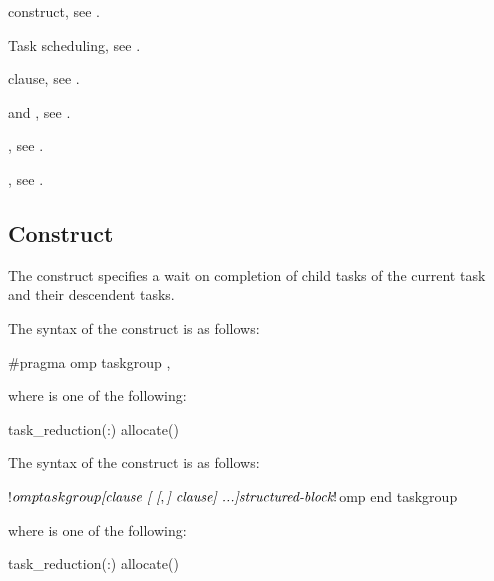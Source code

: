 \begin{crossrefs}
\item {} construct, see .

\item Task scheduling, see
.

\item {} clause, see .

\item {} and , see
.

\item {}, see
.

\item {}, see
.
\end{crossrefs}



\subsection{ Construct}
\label{subsec:taskgroup Construct}
\summary
The  construct specifies a wait on completion of child tasks 
of the current task and their descendent tasks.

\syntax
\begin{ccppspecific}
The syntax of the  construct is as follows:

\begin{ompcPragma}
#pragma omp taskgroup \plc{[clause[[},\plc{] clause] ...]} 
\end{ompcPragma}

where  is one of the following:

\begin{indentedcodelist}
task_reduction(:)
allocate(\plc{[allocator: ]})
\end{indentedcodelist}
\end{ccppspecific}

\begin{fortranspecific}
The syntax of the  construct is as follows:

\begin{ompfPragma}
!$omp taskgroup \plc{[clause [ [},\plc{] clause] ...]}
    \plc{structured-block}
!$omp end taskgroup
\end{ompfPragma}

where  is one of the following:

\begin{indentedcodelist}
task_reduction(:)
allocate(\plc{[allocator: ]})
\end{indentedcodelist}

\end{fortranspecific}

